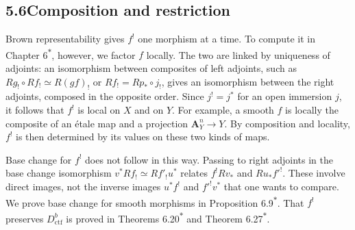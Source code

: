 \documentclass[11pt]{article}
\newcommand{\bpout}[1]{#1\textsuperscript{\hyperlink{bp-outside}{\ensuremath{\ast}}}}
\begin{document}
\subsection*{\texorpdfstring{5.6\quad Composition and restriction}{5.6 Composition and restriction}}
\label{bp102}%
\label{bp103}%
Brown representability gives \(f^!\) one morphism at a time. To compute it in Chapter \bpout{6}, however, we factor \(f\) locally. The two are linked by uniqueness of adjoints: an isomorphism between composites of left adjoints, such as \(Rg_!\circ Rf_!\simeq R(gf)_!\) or \(Rf_!=Rp_*\circ j_!\), gives an isomorphism between the right adjoints, composed in the opposite order. Since \(j^!=j^*\) for an open immersion \(j\), it follows that \(f^!\) is local on \(X\) and on \(Y\). For example, a smooth \(f\) is locally the composite of an étale map and a projection \(\mathbf A^n_Y\to Y\). By composition and locality, \(f^!\) is then determined by its values on these two kinds of maps.

Base change for \(f^!\) does not follow in this way. Passing to right adjoints in the base change isomorphism \(v^*Rf_!\simeq Rf'_!u^*\) relates \(f^!Rv_*\) and \(Ru_*f'^!\). These involve direct images, not the inverse images \(u^*f^!\) and \(f'^!v^*\) that one wants to compare. We prove base change for smooth morphisms in Proposition \bpout{6.9}. That \(f^!\) preserves \(D^b_{\mathrm{ctf}}\) is proved in Theorems \bpout{6.20} and \bpout{Theorem 6.27}.
\end{document}
